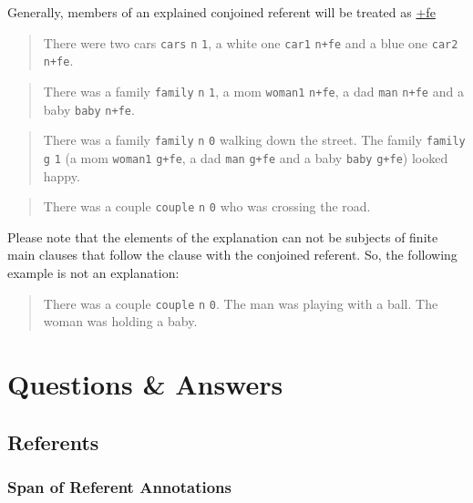 \documentclass[
]{book}
\begin{document}
Generally, members of an explained conjoined referent will be treated as \protect\hyperlink{further-explanation}{+fe}

\begin{quote}
There were two cars \texttt{cars} \texttt{n} \texttt{1}, a white one \texttt{car1} \texttt{n+fe} and a blue one \texttt{car2} \texttt{n+fe}.
\end{quote}

\begin{quote}
There was a family \texttt{family} \texttt{n} \texttt{1}, a mom \texttt{woman1} \texttt{n+fe}, a dad \texttt{man} \texttt{n+fe} and a baby \texttt{baby} \texttt{n+fe}.
\end{quote}

\begin{quote}
There was a family \texttt{family} \texttt{n} \texttt{0} walking down the street. The family \texttt{family} \texttt{g} \texttt{1} (a mom \texttt{woman1} \texttt{g+fe}, a dad \texttt{man} \texttt{g+fe} and a baby \texttt{baby} \texttt{g+fe}) looked happy.
\end{quote}

\begin{quote}
There was a couple \texttt{couple} \texttt{n} \texttt{0} who was crossing the road.
\end{quote}

Please note that the elements of the explanation can not be subjects of finite main clauses that follow the clause with the conjoined referent. So, the following example is not an explanation:

\begin{quote}
There was a couple \texttt{couple} \texttt{n} \texttt{0}. The man was playing with a ball. The woman was holding a baby.
\end{quote}

\hypertarget{questions-answers}{%
\chapter{Questions \& Answers}\label{questions-answers}}

\hypertarget{referents-1}{%
\section{Referents}\label{referents-1}}

\hypertarget{span-of-referent-annotations}{%
\subsection{Span of Referent Annotations}\label{span-of-referent-annotations}}
\end{document}

